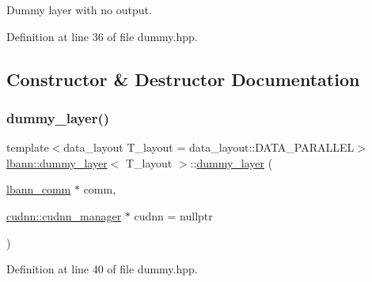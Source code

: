 Dummy layer with no output. 

Definition at line 36 of file dummy.\+hpp.



\subsection{Constructor \& Destructor Documentation}
\mbox{\label{classlbann_1_1dummy__layer_aed5bc546171348eaaf91aaf196406440}} 
\subsubsection{\texorpdfstring{dummy\+\_\+layer()}{dummy\_layer()}}
{\footnotesize\ttfamily template$<$data\+\_\+layout T\+\_\+layout = data\+\_\+layout\+::\+D\+A\+T\+A\+\_\+\+P\+A\+R\+A\+L\+L\+EL$>$ \\
\hyperlink{classlbann_1_1dummy__layer}{lbann\+::dummy\+\_\+layer}$<$ T\+\_\+layout $>$\+::\hyperlink{classlbann_1_1dummy__layer}{dummy\+\_\+layer} (\begin{DoxyParamCaption}\item[{\hyperlink{classlbann_1_1lbann__comm}{lbann\+\_\+comm} $\ast$}]{comm,  }\item[{\hyperlink{classlbann_1_1cudnn_1_1cudnn__manager}{cudnn\+::cudnn\+\_\+manager} $\ast$}]{cudnn = {\ttfamily nullptr} }\end{DoxyParamCaption})\hspace{0.3cm}{\ttfamily [inline]}}



Definition at line 40 of file dummy.\+hpp.


